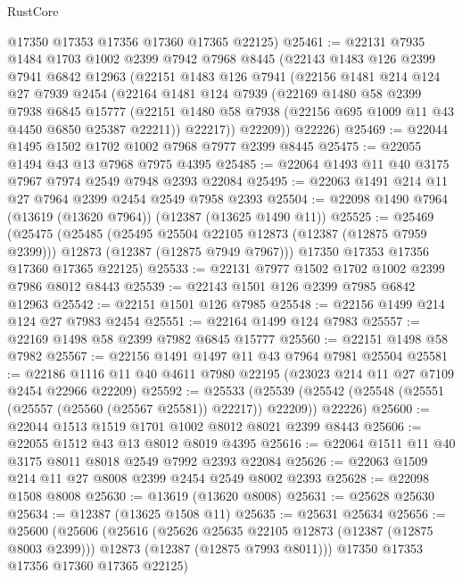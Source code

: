 \begin{lexlean}{RustCore}
\begin{coremodule}
      @17350
      @17353
      @17356
      @17360
      @17365
      @22125)
@25461 := @22131
    @7935
    @1484
    @1703
    @1002
    @2399
    @7942
    @7968
    @8445
    (@22143
      @1483
      @126
      @2399
      @7941
      @6842
      @12963
      (@22151
        @1483
        @126
        @7941
        (@22156
          @1481
          @214
          @124
          @27
          @7939
          @2454
          (@22164
            @1481
            @124
            @7939
            (@22169
              @1480
              @58
              @2399
              @7938
              @6845
              @15777
              (@22151 @1480 @58 @7938 (@22156 @695 @1009 @11 @43 @4450 @6850 @25387 @22211))
              @22217))
          @22209))
      @22226)
@25469 := @22044 @1495 @1502 @1702 @1002 @7968 @7977 @2399 @8445
@25475 := @22055 @1494 @43 @13 @7968 @7975 @4395
@25485 := @22064 @1493 @11 @40 @3175 @7967 @7974 @2549 @7948 @2393 @22084
@25495 := @22063 @1491 @214 @11 @27 @7964 @2399 @2454 @2549 @7958 @2393
@25504 := @22098 @1490 @7964 (@13619 (@13620 @7964)) (@12387 (@13625 @1490 @11))
@25525 := @25469
    (@25475
      (@25485
        (@25495 @25504 @22105 @12873 (@12387 (@12875 @7959 @2399)))
        @12873
        (@12387 (@12875 @7949 @7967)))
      @17350
      @17353
      @17356
      @17360
      @17365
      @22125)
@25533 := @22131 @7977 @1502 @1702 @1002 @2399 @7986 @8012 @8443
@25539 := @22143 @1501 @126 @2399 @7985 @6842 @12963
@25542 := @22151 @1501 @126 @7985
@25548 := @22156 @1499 @214 @124 @27 @7983 @2454
@25551 := @22164 @1499 @124 @7983
@25557 := @22169 @1498 @58 @2399 @7982 @6845 @15777
@25560 := @22151 @1498 @58 @7982
@25567 := @22156 @1491 @1497 @11 @43 @7964 @7981 @25504
@25581 := @22186 @1116 @11 @40 @4611 @7980 @22195 (@23023 @214 @11 @27 @7109 @2454 @22966 @22209)
@25592 := @25533
    (@25539 (@25542 (@25548 (@25551 (@25557 (@25560 (@25567 @25581)) @22217)) @22209)) @22226)
@25600 := @22044 @1513 @1519 @1701 @1002 @8012 @8021 @2399 @8443
@25606 := @22055 @1512 @43 @13 @8012 @8019 @4395
@25616 := @22064 @1511 @11 @40 @3175 @8011 @8018 @2549 @7992 @2393 @22084
@25626 := @22063 @1509 @214 @11 @27 @8008 @2399 @2454 @2549 @8002 @2393
@25628 := @22098 @1508 @8008
@25630 := @13619 (@13620 @8008)
@25631 := @25628 @25630
@25634 := @12387 (@13625 @1508 @11)
@25635 := @25631 @25634
@25656 := @25600
    (@25606
      (@25616
        (@25626 @25635 @22105 @12873 (@12387 (@12875 @8003 @2399)))
        @12873
        (@12387 (@12875 @7993 @8011)))
      @17350
      @17353
      @17356
      @17360
      @17365
      @22125)

\end{coremodule}
\end{lexlean}
